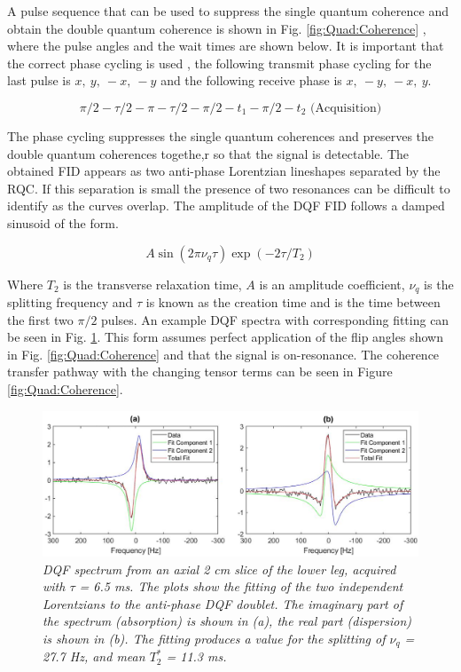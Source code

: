 A pulse sequence that can be used to suppress the single quantum coherence and obtain the double quantum coherence is shown in Fig. \ref{fig:Quad:Coherence} \cite{Sharf1995DetectionNMR-Spectroscopy}, where the pulse angles and the wait times are shown below. It is important that the correct phase cycling is used \cite{Bodenhausen1984SelectionExperiments}, the following transmit phase cycling for the last pulse is $x,\:y,\:-x,\:-y$ and the following receive phase is $x,\:-y,\:-x,\:y$. 

\begin{equation}
    \pi/2-\tau/2-\pi-\tau/2-\pi/2-t_1-\pi/2-t_2 \textrm{ (Acquisition)}
    \label{eqn:Quad:Pulse}
\end{equation}

The phase cycling suppresses the single quantum coherences and preserves the double quantum coherences togethe,r so that the signal is detectable. The obtained FID appears as two anti-phase Lorentzian lineshapes separated by the \ac{RQC}. If this separation is small the presence of two resonances can be difficult to identify as the curves overlap. The amplitude of the \ac{DQF} FID follows a damped sinusoid of the form. 

\begin{equation}
    A\sin(2\pi\nu_q\tau)\exp(-2\tau/T_2)
    \label{eqn:Quad:Amplitude}
\end{equation}

Where $T_2$ is the transverse relaxation time, $A$ is an amplitude coefficient, $\nu_q$ is the splitting frequency and $\tau$ is known as the creation time and is the time between the first two $\pi/2$ pulses. An example \ac{DQF} spectra with corresponding fitting can be seen in Fig. \ref{fig:Quad:Ex_DQF}. This form assumes perfect application of the flip angles shown in Fig. \ref{fig:Quad:Coherence} and that the signal is on-resonance. The coherence transfer pathway with the changing tensor terms can be seen in Figure \ref{fig:Quad:Coherence}.

\begin{figure}
    \centering
    \includegraphics[width=1\textwidth]{Figures/Quad/Example_DQF.png}
    \caption{\textit{\ac{DQF} spectrum from an axial 2 cm slice of the lower leg, acquired with $\tau$ = 6.5 ms. The plots show the fitting of the two independent Lorentzians to the anti-phase \ac{DQF} doublet. The imaginary part of the spectrum (absorption) is shown in (a), the real part (dispersion) is shown in (b). The fitting produces a value for the splitting of $\nu_q$ = 27.7 Hz, and mean $T_2^*$ = 11.3 ms.}}
    \label{fig:Quad:Ex_DQF}
\end{figure}

